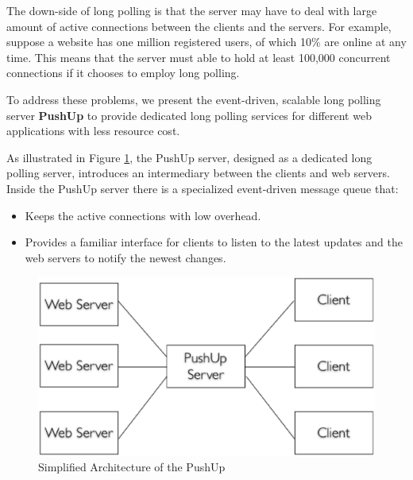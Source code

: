 The down-side of long polling is that the server may have to deal with large
amount of active connections between the clients and the servers. For example,
suppose a website has one million registered users, of which 10\% are online at any 
time. This means that the server must able to hold at least 100,000 concurrent 
connections if it chooses to employ long polling.

To address these problems, we present the event-driven, scalable
long polling server \textbf{PushUp} to provide dedicated long polling services for 
different web applications with less resource cost.

As illustrated in Figure \ref{fig:sim_pushup}, the PushUp server, designed
as a dedicated long polling server, introduces an intermediary between
the clients and web servers. Inside the PushUp server there is a specialized 
event-driven message queue that:
\begin {itemize}
    \item[1] Keeps the active connections with low overhead.
    \item[2] Provides a familiar interface for clients to listen to the latest 
             updates and the web servers to notify the newest changes.
\end {itemize}


\begin{figure}[htb!]
\centering
    \includegraphics[scale=0.40]{figures/sim_pushup.eps}
    \caption{Simplified Architecture of the PushUp}
    \label{fig:sim_pushup}
\end{figure}
